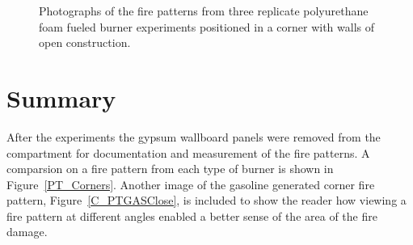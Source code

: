 \documentclass[twoside]{uocthesis}
\begin{document}
{\begin{figure}[p]
	\caption[Photographs of the fire patterns from three replicate polyurethane foam burner experiments positioned in a corner]{Photographs of the fire patterns from three replicate polyurethane foam fueled burner experiments positioned in a corner with walls of open construction.}
	\label{PUF_Corner}
\end{figure}

\section{Summary}

After the experiments the gypsum wallboard panels were removed from the compartment for documentation and measurement of the fire patterns.  A comparsion on a fire pattern from each type of burner is shown in Figure~\ref{PT_Corners}.  Another image of the gasoline generated corner fire pattern, Figure~\ref{C_PTGASClose}, is included to show the reader how viewing a fire pattern at different angles enabled a better sense of the area of the fire damage. 

}
\end{document}
